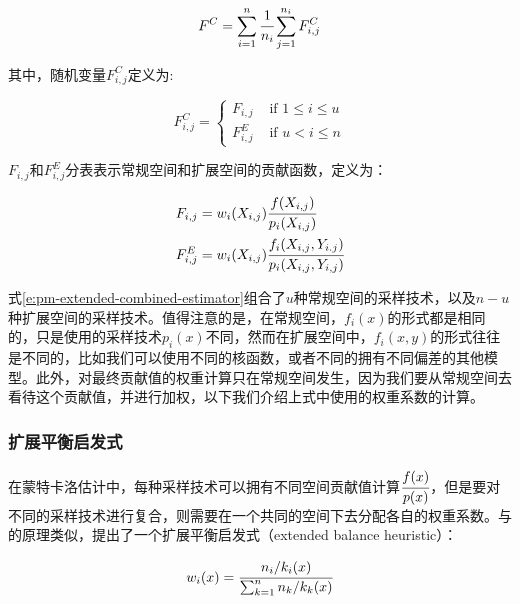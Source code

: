 \begin{equation}\label{e:pm-extended-combined-estimator}
	F^{C}=\sum^{n}_{i=1} \cfrac{1}{n_i}\sum^{n_i}_{j=1}F^{C}_{i,j}
\end{equation}

\noindent 其中，随机变量$F^{C}_{i,j}$定义为:

\begin{equation}
	F^{C}_{i,j}=\begin{cases}
		F_{i,j} & \text{ if } 1\leq i\leq u\\
		F^{E}_{i,j}& \text{ if } u< i\leq n
	\end{cases}
\end{equation}

\noindent $F_{i,j}$和$F^{E}_{i,j}$分表表示常规空间和扩展空间的贡献函数，定义为：

\begin{equation}
	\begin{aligned}
		F_{i,j}&=w_i(X_{i,j}) \cfrac{f(X_{i,j})}{p_i(X_{i,j})}\\
		F^{E}_{i,j}&=w_i(X_{i,j}) \cfrac{f_i(X_{i,j},Y_{i.j})}{p_i(X_{i,j},Y_{i,j})}
	\end{aligned}
\end{equation}

式\ref{e:pm-extended-combined-estimator}组合了$u$种常规空间的采样技术，以及$n-u$种扩展空间的采样技术。值得注意的是，在常规空间，$f_i(x)$的形式都是相同的，只是使用的采样技术$p_i(x)$不同，然而在扩展空间中，$f_i(x,y)$的形式往往是不同的，比如我们可以使用不同的核函数，或者不同的拥有不同偏差的其他模型。此外，对最终贡献值的权重计算只在常规空间发生，因为我们要从常规空间去看待这个贡献值，并进行加权，以下我们介绍上式中使用的权重系数的计算。




\subsubsection{扩展平衡启发式}
在蒙特卡洛估计中，每种采样技术可以拥有不同空间贡献值计算$ \cfrac{f(x)}{p(x)}$，但是要对不同的采样技术进行复合，则需要在一个共同的空间下去分配各自的权重系数。与\cite{a:RobustMonteCarloMethodsforLightTransportSimulation}的原理类似，\cite{a:UnifyingPointsBeamsandPathsinVolumetricLightTransportSimulation}提出了一个扩展平衡启发式（extended balance heuristic）：

\begin{equation}
	w_i(x)= \cfrac{n_i/k_i(x)}{\sum^{n}_{k=1}n_k/k_k(x)}
\end{equation}

